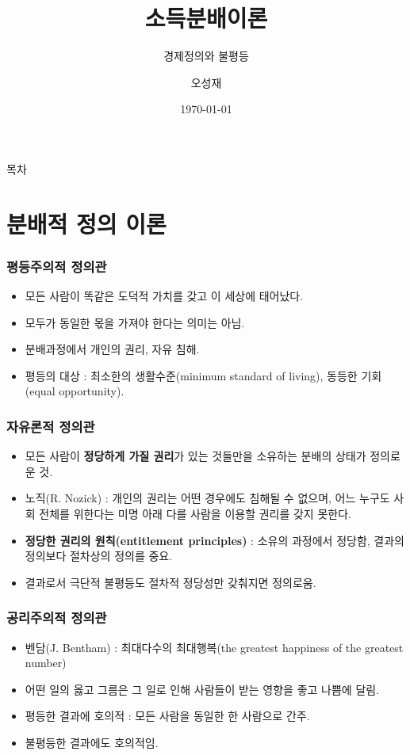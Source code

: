 \documentclass[aspectratio=169,xcolor=dvipsnames,handout]{beamer}
\title[소득분배이론과 정책]{소득분배이론} %
\subtitle{경제정의와 불평등}
\author[오성재]{오성재}
\institute[HNU] %
{
    한남대학교 \\
    탈메이지 교양학부 \\
}
\date{\today} %
\begin{document}
\begin{frame}
    \titlepage
\end{frame}

\begin{frame}{목차}
    \tableofcontents
\end{frame}
\section{분배적 정의 이론}

\begin{frame}[<+->]
\frametitle{평등주의적 정의관}
    \begin{itemize}
        \item 모든 사람이 똑같은 도덕적 가치를 갖고 이 세상에 태어났다.
        \item 모두가 동일한 몫을 가져야 한다는 의미는 아님.
        \item 분배과정에서 개인의 권리, 자유 침해.
        \item 평등의 대상 : 최소한의 생활수준(minimum standard of living), 동등한 기회(equal opportunity).
    \end{itemize}
\end{frame}

\begin{frame}[<+->]
\frametitle{자유론적 정의관}
    \begin{itemize}
        \item 모든 사람이 {\bf 정당하게 가질 권리}가 있는 것들만을 소유하는 분배의 상태가 정의로운 것.
        \item 노직(R. Nozick) : 개인의 권리는 어떤 경우에도 침해될 수 없으며, 어느 누구도 사회 전체를 위한다는 미명 아래 다를 사람을 이용할 권리를 갖지 못한다.
        \item {\bf 정당한 권리의 원칙(entitlement principles)} : 소유의 과정에서 정당함, 결과의 정의보다 절차상의 정의를 중요.
        \item 결과로서 극단적 불평등도 절차적 정당성만 갖춰지면 정의로움.
    \end{itemize}
\end{frame}

\begin{frame}[<+->]
\frametitle{공리주의적 정의관}
    \begin{itemize}
        \item 벤담(J. Bentham) : 최대다수의 최대행복(the greatest happiness of the greatest number)
        \item 어떤 일의 옳고 그름은 그 일로 인해 사람들이 받는 영향을 좋고 나쁨에 달림.
        \item 평등한 결과에 호의적 : 모든 사람을 동일한 한 사람으로 간주.
        \item 불평등한 결과에도 호의적임.
    \end{itemize}
\end{frame}
\end{document}
